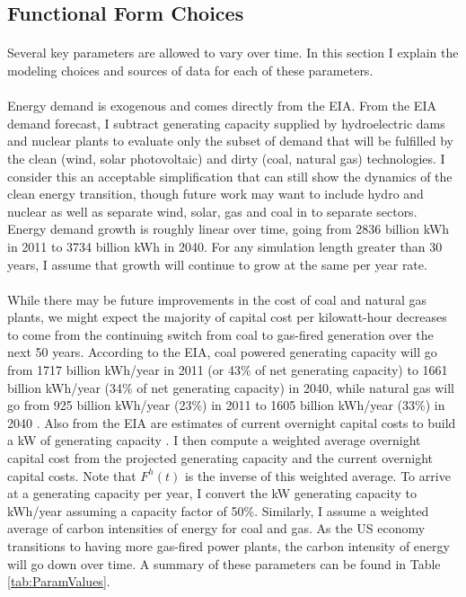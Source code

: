 \documentclass{easychithesis}
\begin{document}
\subsection{Functional Form Choices}

\paragraph{} Several key parameters are allowed to vary over time. In this section I explain the modeling choices and sources of data for each of these parameters. 

\paragraph{} Energy demand is exogenous and comes directly from the EIA. From the EIA demand forecast, I subtract generating capacity supplied by hydroelectric dams and nuclear plants to evaluate only the subset of demand that will be fulfilled by the clean (wind, solar photovoltaic) and dirty (coal, natural gas) technologies. I consider this an acceptable simplification that can still show the dynamics of the clean energy transition, though future work may want to include hydro and nuclear as well as separate wind, solar, gas and coal in to separate sectors. Energy demand growth is roughly linear over time, going from 2836 billion kWh in 2011 to 3734 billion kWh in 2040. For any simulation length greater than 30 years, I assume that growth will continue to grow at the same per year rate. 

\paragraph{} While there may be future improvements in the cost of coal and natural gas plants, we might expect the majority of capital cost per kilowatt-hour decreases to come from the continuing switch from coal to gas-fired generation over the next 50 years. According to the EIA, coal powered generating capacity will go from 1717 billion kWh/year in 2011 (or 43\% of net generating capacity) to 1661 billion kWh/year (34\% of net generating capacity) in 2040, while natural gas will go from 925 billion kWh/year (23\%) in 2011 to 1605 billion kWh/year (33\%) in 2040 \cite{EIATable5}. Also from the EIA are estimates of current overnight capital costs to build a kW of generating capacity \cite{EIACapCost}. I then compute a weighted average overnight capital cost from the projected generating capacity and the current overnight capital costs. Note that $F^h(t)$ is the inverse of this weighted average. To arrive at a generating capacity per year, I convert the kW generating capacity to kWh/year assuming a capacity factor of 50\%. Similarly, I assume a weighted average of carbon intensities of energy for coal and gas. As the US economy transitions to having more gas-fired power plants, the carbon intensity of energy will go down over time. A summary of these parameters can be found in Table \ref{tab:ParamValues}. 
\end{document}
